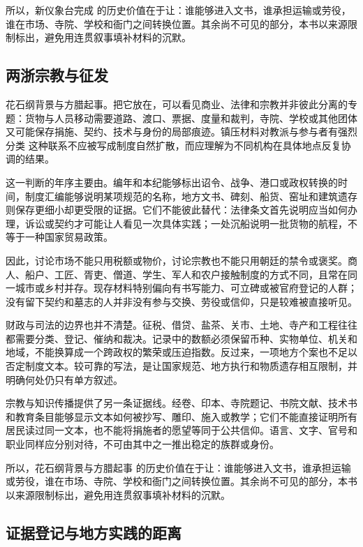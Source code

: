 所以，新仪象台完成 的历史价值在于让：谁能够进入文书，谁承担运输或劳役，谁在市场、寺院、学校和衙门之间转换位置。其余尚不可见的部分，本书以来源限制标出，避免用连贯叙事填补材料的沉默。

\subsection{两浙宗教与征发}

花石纲背景与方腊起事。把它放在，可以看见商业、法律和宗教并非彼此分离的专题：货物与人员移动需要道路、渡口、票据、度量和裁判，寺院、学校或其他团体又可能保存捐施、契约、技术与身份的局部痕迹。镇压材料对教派与参与者有强烈分类 这种联系不应被写成制度自然扩散，而应理解为不同机构在具体地点反复协调的结果。

这一判断的年序主要由。编年和本纪能够标出诏令、战争、港口或政权转换的时间，制度汇编能够说明某项规范的名称，地方文书、碑刻、船货、窑址和建筑遗存则保存更细小却更受限的证据。它们不能彼此替代：法律条文首先说明应当如何办理，诉讼或契约才可能让人看见一次具体实践；一处沉船说明一批货物的航程，不等于一种国家贸易政策。

因此，讨论市场不能只用税额或物价，讨论宗教也不能只用朝廷的禁令或褒奖。商人、船户、工匠、胥吏、僧道、学生、军人和农户接触制度的方式不同，且常在同一城市或乡村并存。现存材料特别偏向有书写能力、可立碑或被官府登记的人群；没有留下契约和墓志的人并非没有参与交换、劳役或信仰，只是较难被直接听见。

财政与司法的边界也并不清楚。征税、借贷、盐茶、关市、土地、寺产和工程往往都需要分类、登记、催纳和裁决。记录中的数额必须保留币种、实物单位、机关和地域，不能换算成一个跨政权的繁荣或压迫指数。反过来，一项地方个案也不足以否定制度文本。较可靠的写法，是让国家规范、地方执行和物质遗存相互限制，并明确何处仍只有单方叙述。

宗教与知识传播提供了另一条证据线。经卷、印本、寺院题记、书院文献、技术书和教育条目能够显示文本如何被抄写、雕印、施入或教学；它们不能直接证明所有居民读过同一文本，也不能将捐施者的愿望等同于公共信仰。语言、文字、官号和职业同样应分别对待，不可由其中之一推出稳定的族群或身份。

所以，花石纲背景与方腊起事 的历史价值在于让：谁能够进入文书，谁承担运输或劳役，谁在市场、寺院、学校和衙门之间转换位置。其余尚不可见的部分，本书以来源限制标出，避免用连贯叙事填补材料的沉默。

\subsection{证据登记与地方实践的距离}

